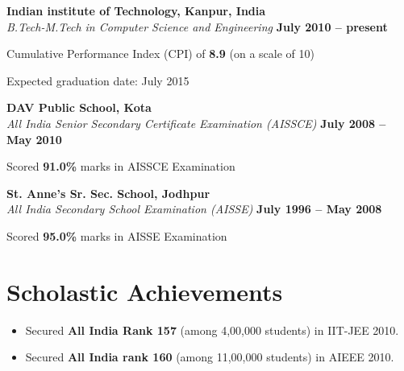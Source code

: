 \documentclass[margin,line]{resume}
\begin{document}
\begin{resume}
  \textbf{Indian institute of Technology, Kanpur, India} \vspace{2mm}\\\vspace{1mm}%
  \textsl{B.Tech-M.Tech in Computer Science and Engineering} \hfill \textbf{ July 2010 -- present}\vspace{-3mm}\\\vspace{-1mm}%
  \begin{list2}
  \item Cumulative Performance Index (CPI) of \textbf{\textsf{8.9}} (on a scale of 10)
  \item Expected graduation date: July 2015
  \end{list2}\vspace{-1.5mm}
  \textbf{DAV Public School, Kota} \vspace{2mm}\\\vspace{1mm}%
  \textsl{All India Senior Secondary Certificate Examination (AISSCE)} \hfill \textbf{ July 2008 -- May 2010}\vspace{-3mm}\\\vspace{-1mm}%
  \begin{list2}
  \item Scored \textbf{\textsf{91.0\%}} marks in AISSCE Examination
  \end{list2}
  \textbf{St. Anne's Sr. Sec. School, Jodhpur} \vspace{2mm}\\\vspace{1mm}%
  \textsl{All India Secondary School Examination (AISSE)} \hfill \textbf{ July 1996 -- May 2008}\vspace{-3mm}\\\vspace{-1mm}%
  \begin{list2}
  \item Scored \textbf{\textsf {95.0\%}} marks in AISSE Examination
  \end{list2}
  \vspace{-1mm}%


  \section{\mysidestyle Scholastic Achievements}
  \begin{itemize}
  \item Secured \textbf{\textsf{All India Rank 157}} (among 4,00,000 students) in IIT-JEE 2010.
  \item Secured \textbf{\textsf{All India rank 160}} (among 11,00,000 students) in AIEEE 2010.
  \end{itemize}


\end{resume}
\end{document}
